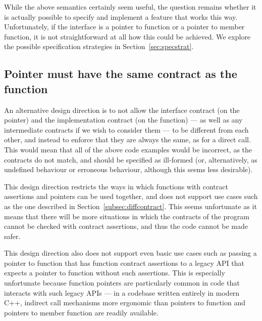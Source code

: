 While the above semantics certainly seem useful, the question remains whether it is actually possible to specify and implement a feature that works this way. Unfortunately, if the interface is a pointer to function or a pointer to member function, it is not straightforward at all how this could be achieved. We explore the possible specification strategies in Section~\ref{sec:specstrat}.

\subsection{Pointer must have the same contract as the function}
\label{subsec:samecontract}

An alternative design direction is to not allow the interface contract (on the pointer) and the implementation contract (on the function) --- as well as any intermediate contracts if we wish to consider them --- to be different from each other, and instead to enforce that they are always the same, as for a direct call. This would mean that all of the above code examples would be incorrect, as the contracts do not match, and should be specified as ill-formed (or, alternatively, as undefined behaviour or erroneous behaviour, although this seems less desirable).

This design direction restricts the ways in which functions with contract assertions and pointers can be used together, and does not support use cases such as the one described in Section~\ref{subsec:diffcontract}. This seems unfortunate as it means that there will be more situations in which the contracts of the program cannot be checked with contract assertions, and thus the code cannot be made safer. 

This design direction also does not support even basic use cases such as passing a pointer to function that has function contract assertions to a legacy API that expects a pointer to function without such assertions. This is especially unfortunate because function pointers are particularly common in code that interacts with such legacy APIs --- in a codebase written entirely in modern C++, indirect call mechanisms more ergonomic than pointers to function and pointers to member function are readily available.

